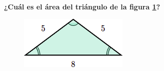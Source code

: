 \begin{multicols}{2}
    \textbf{¿Cuál es el \'area del triángulo de la figura \ref{fig:area_isoseles_03}?}

    \begin{figure}[H]
        \centering
        \includegraphics[width=0.4\linewidth]{../images/area_isoseles_03.png}
        \caption{}
        \label{fig:area_isoseles_03}
    \end{figure}
\end{multicols}

\vspace{-0.5cm}
